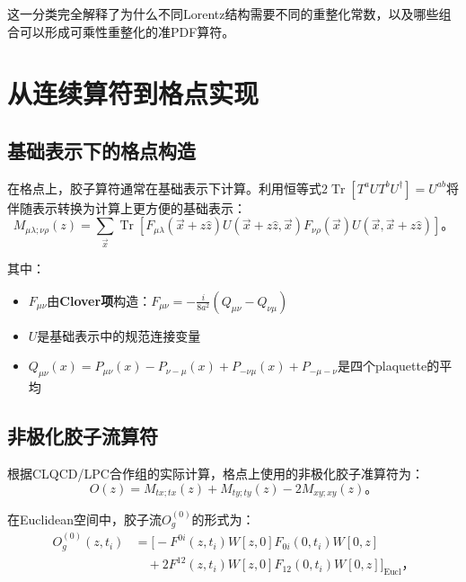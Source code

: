 \documentclass[12pt,a4paper]{ctexart}
\theoremstyle{definition}
\begin{document}
这一分类完全解释了为什么不同Lorentz结构需要不同的重整化常数，以及哪些组合可以形成可乘性重整化的准PDF算符。

\section{从连续算符到格点实现}

\subsection{基础表示下的格点构造}

在格点上，胶子算符通常在基础表示下计算。利用恒等式$2\operatorname{Tr}[T^a U T^b U^\dagger] = U^{ab}$将伴随表示转换为计算上更方便的基础表示\cite{Chen2025gluon}：
\begin{equation}
M_{\mu\lambda;\nu\rho}(z) = \sum_{\vec{x}} \operatorname{Tr}[F_{\mu\lambda}(\vec{x} + z\hat{z}) U(\vec{x} + z\hat{z}, \vec{x}) F_{\nu\rho}(\vec{x}) U(\vec{x}, \vec{x} + z\hat{z})]。
\label{eq:lattice_ME}
\end{equation}

其中：
\begin{itemize}
    \item $F_{\mu\nu}$由\textbf{Clover项}构造：$F_{\mu\nu} = -\frac{i}{8a^2}(Q_{\mu\nu} - Q_{\nu\mu})$
    \item $U$是基础表示中的规范连接变量
    \item $Q_{\mu\nu}(x) = P_{\mu\nu}(x) - P_{\nu-\mu}(x) + P_{-\nu\mu}(x) + P_{-\mu-\nu}$是四个plaquette的平均
\end{itemize}

\subsection{非极化胶子流算符}

根据CLQCD/LPC合作组的实际计算\cite{Chen2025gluon}，格点上使用的非极化胶子准算符为：
\begin{equation}
O(z) = M_{tx;tx}(z) + M_{ty;ty}(z) - 2M_{xy;xy}(z)。
\label{eq:unpol_lattice_op}
\end{equation}

在Euclidean空间中，胶子流$O^{(0)}_g$的形式为：
\begin{equation}
\begin{aligned}
O^{(0)}_g(z, t_i) &= \Big[ -F^{0i}(z,t_i)W[z,0]F_{0i}(0,t_i)W[0,z] \\
&\quad + 2F^{12}(z,t_i)W[z,0]F_{12}(0,t_i)W[0,z] \Big]_{\text{Eucl}}，
\end{aligned}
\label{eq:Og0_eucl}
\end{equation}
\end{document}
